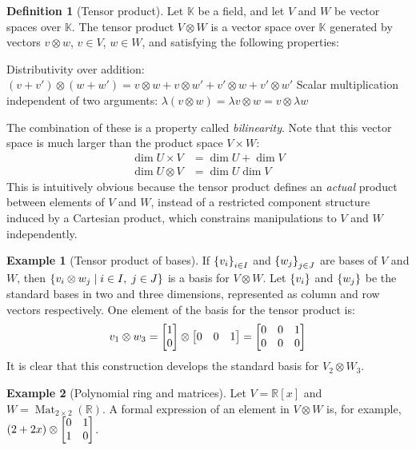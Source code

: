 \documentclass{article}
\theoremstyle{definition}
\newtheorem{Definition}{Definition}
\newtheorem*{Example*}{Example}
\theoremstyle{remark}
\theoremstyle{underline}
\theoremstyle{underline}
\DeclareMathOperator{\Mat}{Mat}
\begin{document}
\begin{Definition}[Tensor product]\label{def:TensorProd}
Let $\mathbb{K}$ be a field, and let $V$ and $W$ be vector spaces over $\mathbb{K}$. The tensor product $ V\otimes W $ is a vector space over $ \mathbb{K} $ generated by vectors $v \otimes w$, $v \in V$, $w \in W$, and satisfying the following properties:
\begin{center}
	Distributivity over addition: \hfill $ (v + v') \otimes (w + w') = v \otimes w + v \otimes w' + v' \otimes w + v' \otimes w'$
	Scalar multiplication independent of two arguments: \hfill $ \lambda(v \otimes w) = \lambda v \otimes w = v \otimes \lambda w$
\end{center}
\end{Definition}

The combination of these is a property called \emph{bilinearity}. Note that this vector space is much larger than the product space $V \times W$:
\begin{align*}
	\dim U \times V & = \dim U + \dim V\\
	\dim U \otimes V & = \dim U \dim V
\end{align*}
This is intuitively obvious because the tensor product defines an \emph{actual} product between elements of $V$ and $W$, instead of a restricted component structure induced by a Cartesian product, which constrains manipulations to $V$ and $W$ independently.

\begin{Example*}[Tensor product of bases]
If $ \qty{v_i}_{i \in I}$ and $ \qty{w_j}_{j \in J} $ are bases of $V$ and $W$, then $ \qty{v_i \otimes w_j \mid i \in I, \; j \in J}$ is a basis for $V \otimes W$. Let $ \qty{v_i}$ and $\qty{w_j} $ be the standard bases in two and three dimensions, represented as column and row vectors respectively. One element of the basis for the tensor product is:
\begin{gather*}
	v_1 \otimes w_3 = \mqty[1 \\ 0] \otimes \mqty[0 & 0 & 1]  = \mqty[0 & 0 & 1 \\ 0 & 0 & 0]
\end{gather*}
It is clear that this construction develops the standard basis for $V_{2} \otimes W_{3}$.
\end{Example*}

\begin{Example*}[Polynomial ring and matrices] 
Let $ V = \mathbb{R}[x]$ and $ W = \Mat_{2\times 2}(\mathbb{R})$. A formal expression of an element in $V \otimes W $ is, for example, $(2 + 2x) \otimes \mqty[0 & 1 \\ 1 & 0]$.
\end{Example*}
\end{document}
